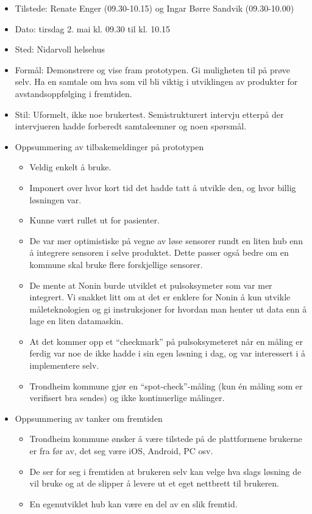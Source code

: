 \def\tightlist{}

\begin{itemize}
\tightlist
\item
  Tilstede: Renate Enger (09.30-10.15) og Ingar Børre Sandvik
  (09.30-10.00)
\item
  Dato: tirsdag 2. mai kl. 09.30 til kl. 10.15
\item
  Sted: Nidarvoll helsehus
\item
  Formål: Demonstrere og vise fram prototypen. Gi muligheten til på
  prøve selv. Ha en samtale om hva som vil bli viktig i utviklingen av
  produkter for avstandsoppfølging i fremtiden.
\item
  Stil: Uformelt, ikke noe brukertest. Semistrukturert intervju etterpå
  der intervjueren hadde forberedt samtaleemner og noen spørsmål.
\item
  Oppsummering av tilbakemeldinger på prototypen

  \begin{itemize}
  \tightlist
  \item
    Veldig enkelt å bruke.
  \item
    Imponert over hvor kort tid det hadde tatt å utvikle den, og hvor
    billig løsningen var.
  \item
    Kunne vært rullet ut for pasienter.
  \item
    De var mer optimistiske på vegne av løse sensorer rundt en liten hub
    enn å integrere sensoren i selve produktet. Dette passer også bedre
    om en kommune skal bruke flere forskjellige sensorer.
  \item
    De mente at Nonin burde utviklet et pulsoksymeter som var mer
    integrert. Vi snakket litt om at det er enklere for Nonin å kun
    utvikle måleteknologien og gi instruksjoner for hvordan man henter
    ut data enn å lage en liten datamaskin.
  \item
    At det kommer opp et ``checkmark'' på pulsoksymeteret når en måling
    er ferdig var noe de ikke hadde i sin egen løsning i dag, og var
    interessert i å implementere selv.
  \item
    Trondheim kommune gjør en ``spot-check''-måling (kun én måling som
    er verifisert bra sendes) og ikke kontinuerlige målinger.
  \end{itemize}
\item
  Oppsummering av tanker om fremtiden

  \begin{itemize}
  \tightlist
  \item
    Trondheim kommune ønsker å være tilstede på de plattformene brukerne
    er fra før av, det seg være iOS, Android, PC osv.
  \item
    De ser for seg i fremtiden at brukeren selv kan velge hva slags
    løsning de vil bruke og at de slipper å levere ut et eget nettbrett
    til brukeren.
  \item
    En egenutviklet hub kan være en del av en slik fremtid.
  \end{itemize}
\end{itemize}

